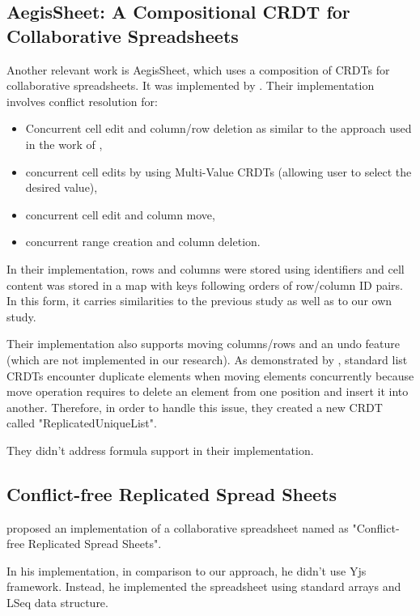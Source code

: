 \documentclass{article}
\begin{document}
\subsection{AegisSheet: A Compositional CRDT for Collaborative Spreadsheets} \par

Another relevant work is AegisSheet, which uses a composition of CRDTs for collaborative spreadsheets. 
It was implemented by \textcite{pfeil2026aegissheet}. Their implementation involves conflict resolution for:

\begin{itemize}
    \item Concurrent cell edit and column/row deletion as similar to the approach used in the work of \textcite{yanakieva2023study},
    \item concurrent cell edits by using Multi-Value CRDTs (allowing user to select the desired value),
    \item concurrent cell edit and column move,
    \item concurrent range creation and column deletion.
\end{itemize}

In their implementation, rows and columns were stored using identifiers and 
cell content was stored in a map with keys following orders of row/column ID pairs. 
In this form, it carries similarities to the previous study as well as to our own study.

Their implementation also supports moving columns/rows and an undo feature (which are not implemented in our research).
As demonstrated by \textcite{kleppmann2020moving}, standard list CRDTs encounter duplicate elements 
when moving elements concurrently because move operation requires to delete an element from one position and insert it into another.
Therefore, in order to handle this issue, they created a new CRDT called "ReplicatedUniqueList".


They didn't address formula support in their implementation.

\subsection{Conflict-free Replicated Spread Sheets}
\textcite{sypytkowski2023crdttables} proposed an implementation of a collaborative spreadsheet named as "Conflict-free Replicated Spread Sheets".

In his implementation, in comparison to our approach, he didn't use Yjs framework. Instead, he implemented the spreadsheet using
standard arrays and LSeq data structure. 
\end{document}

